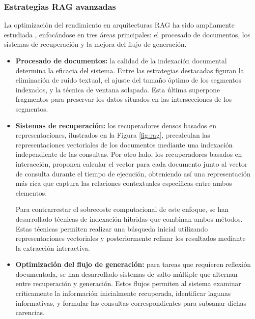 \subsubsection{Estrategias RAG avanzadas}
\label{sec:estr_rag}
La optimización del rendimiento en arquitecturas RAG ha sido ampliamente estudiada \cite{zhu_retrieving_2021}\cite{gao_retrieval-augmented_2024}, enfocándose en tres áreas principales: el procesado de documentos, los sistemas de recuperación y la mejora del flujo de generación.
\begin{itemize}
  \item {\textbf{Procesado de documentos:}} la calidad de la indexación documental determina la eficacia del sistema. Entre las estrategias destacadas figuran la eliminación de ruido textual, el ajuste del tamaño óptimo de los segmentos indexados, y la técnica de ventana solapada. Esta última superpone fragmentos para preservar los datos situados en las intersecciones de los segmentos. 

\item {\textbf{Sistemas de recuperación:}} los recuperadores densos basados en representaciones, ilustrados en la Figura \ref{fig:rag}, precalculan las representaciones vectoriales de los documentos mediante una indexación independiente de las consultas. Por otro lado, los recuperadores basados en interacción, proponen calcular el vector para cada documento junto al vector de consulta durante el tiempo de ejecución, obteniendo así una representación más rica que captura las relaciones contextuales específicas entre ambos elementos\cite{ma_query_nodate}\cite{levine_standing_2022}.

Para contrarrestar el sobrecoste computacional de este enfoque, se han desarrollado técnicas de indexación híbridas que combinan ambos métodos. Estas técnicas permiten realizar una búsqueda inicial utilizando representaciones vectoriales y posteriormente refinar los resultados mediante la extracción interactiva\cite{khattab_relevance-guided_2021}. 
  
\item {\textbf{Optimización del flujo de generación:}} para tareas que requieren reflexión documentada, se han desarrollado sistemas de salto múltiple que alternan entre recuperación y generación\cite{khattab_demonstrate-search-predict_2023}\cite{shao_enhancing_2023}\cite{qi_answering_2021}\cite{zheng_take_2024}\cite{trivedi_interleaving_2023}. Estos flujos permiten al sistema examinar críticamente la información inicialmente recuperada, identificar lagunas informativas, y formular las consultas correspondientes para subsanar dichas carencias.

\end{itemize}

